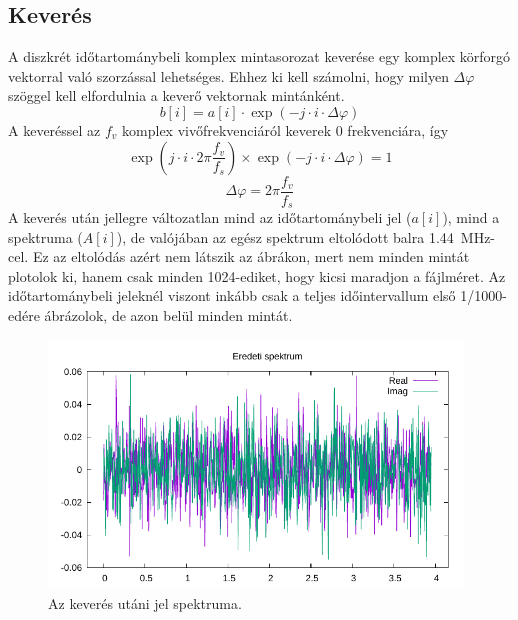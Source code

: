 	\subsection{Keverés}
		A diszkrét időtartománybeli komplex mintasorozat keverése egy komplex körforgó vektorral való szorzással lehetséges. Ehhez ki kell számolni, hogy milyen $\Delta\varphi$ szöggel kell elfordulnia a keverő vektornak mintánként.
		\begin{equation}
			b[i] = a[i]\cdot \exp(-j\cdot i\cdot\Delta\varphi)
		\end{equation}
		A keveréssel az $f_v$ komplex vivőfrekvenciáról keverek 0 frekvenciára, így
		\begin{equation}
			\exp(j\cdot i\cdot2\pi\dfrac{f_v}{f_s})\times\exp(-j\cdot i\cdot\Delta\varphi) = 1
		\end{equation}
		\begin{equation}
			\Delta\varphi = 2\pi\dfrac{f_v}{f_s}
		\end{equation}
		A keverés után jellegre változatlan mind az időtartománybeli jel ($a[i]$), mind a spektruma ($A[i]$), de valójában az egész spektrum eltolódott balra \qty{1.44}{MHz}-cel. Ez az eltolódás azért nem látszik az ábrákon, mert nem minden mintát plotolok ki, hanem csak minden 1024-ediket, hogy kicsi maradjon a fájlméret. Az időtartománybeli jeleknél viszont inkább csak a teljes időintervallum első 1/1000-edére ábrázolok, de azon belül minden mintát.
		\begin{figure}[h!]
			\centering
			\includegraphics[width=0.98\textwidth]{kep/original_spectrum.pdf}
			\caption{Az keverés utáni jel spektruma.}
			\label{fig:mixed}
		\end{figure}
